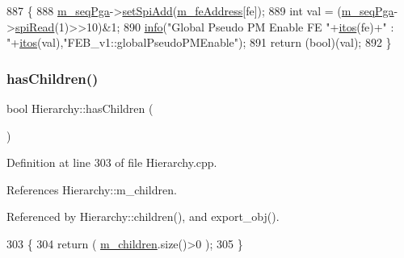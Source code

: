 \begin{DoxyCode}
887                                          \{
888   \hyperlink{classFEB__v1_a6c7804ac86796f233a8393043adf2e77}{m\_seqPga}->\hyperlink{classSeqPGA_ac998ce3a6d9b5f2e88cc8393f8c1df53}{setSpiAdd}(\hyperlink{classFEB__v1_a4e1945c2d5b434125f375e9d0fc6d99f}{m\_feAddress}[fe]);
889   \textcolor{keywordtype}{int} val = (\hyperlink{classFEB__v1_a6c7804ac86796f233a8393043adf2e77}{m\_seqPga}->\hyperlink{classSeqPGA_ab3d0e5e5d4014bc7a92588a76b8713d4}{spiRead}(1)>>10)&1;
890   \hyperlink{classObject_a644fd329ea4cb85f54fa6846484b84a8}{info}(\textcolor{stringliteral}{"Global Pseudo PM Enable FE "}+\hyperlink{Tools_8h_af330027dbdafb9a30768b3613c553e60}{itos}(fe)+\textcolor{stringliteral}{" : "}+\hyperlink{Tools_8h_af330027dbdafb9a30768b3613c553e60}{itos}(val),\textcolor{stringliteral}{"FEB\_v1::globalPseudoPMEnable"});
891   \textcolor{keywordflow}{return} (\textcolor{keywordtype}{bool})(val);
892 \}
\end{DoxyCode}
\mbox{\label{classHierarchy_a255174fe4d316d2a3f430dcb9dab29f1}} 
\subsubsection{\texorpdfstring{has\+Children()}{hasChildren()}}
{\footnotesize\ttfamily bool Hierarchy\+::has\+Children (\begin{DoxyParamCaption}{ }\end{DoxyParamCaption})\hspace{0.3cm}{\ttfamily [inherited]}}



Definition at line 303 of file Hierarchy.\+cpp.



References Hierarchy\+::m\+\_\+children.



Referenced by Hierarchy\+::children(), and export\+\_\+obj().


\begin{DoxyCode}
303                               \{
304   \textcolor{keywordflow}{return} ( \hyperlink{classHierarchy_a038816763941fd4a930504917f60483b}{m\_children}.size()>0 );
305 \}
\end{DoxyCode}
\mbox{\label{classFEB__v1_af93db546ad89ba7c2301fdc2314efd8a}} 
